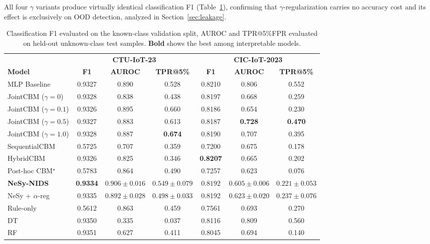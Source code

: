 \documentclass[journal]{IEEEtran}
\begin{document}
All four $\gamma$ variants produce virtually identical classification F1 (Table~\ref{tab:main}), confirming that $\gamma$-regularization carries no accuracy cost and its effect is exclusively on OOD detection, analyzed in Section~\ref{sec:leakage}.


\begin{table}[!t]
\renewcommand{\arraystretch}{1.15}
\caption{Classification F1 evaluated on the known-class validation split, AUROC and TPR@5\%FPR evaluated on
  held-out unknown-class test samples.
  \textbf{Bold} shows the best among interpretable models.}
\label{tab:main}
\centering
\small
\begin{tabular}{lcccccc}
\toprule
& \multicolumn{3}{c}{\textbf{CTU-IoT-23}} &
  \multicolumn{3}{c}{\textbf{CIC-IoT-2023}} \\
\cmidrule(lr){2-4}\cmidrule(lr){5-7}
\textbf{Model} & \textbf{F1} & \textbf{AUROC} & \textbf{TPR@5\%} &
                 \textbf{F1} & \textbf{AUROC} & \textbf{TPR@5\%} \\
\midrule
MLP Baseline
  & 0.9327 & 0.890 & 0.528
  & 0.8210 & 0.806 & 0.552 \\
\midrule
JointCBM ($\gamma{=}0$)
  & 0.9328 & 0.838 & 0.438
  & 0.8197 & 0.668 & 0.259 \\
JointCBM ($\gamma{=}0.1$)
  & 0.9326 & 0.895 & 0.660
  & 0.8186 & 0.654 & 0.230 \\
JointCBM ($\gamma{=}0.5$)
  & 0.9327 & 0.883 & 0.613
  & 0.8187 & \textbf{0.728} & \textbf{0.470} \\
JointCBM ($\gamma{=}1.0$)
  & 0.9328 & 0.887 & \textbf{0.674}
  & 0.8190 & 0.707 & 0.395 \\
SequentialCBM
  & 0.5725 & 0.707 & 0.359
  & 0.7200 & 0.675 & 0.178 \\
HybridCBM
  & 0.9326 & 0.825 & 0.346
  & \textbf{0.8207} & 0.665 & 0.202 \\
Post-hoc CBM$^\star$
  & 0.5783 & 0.864 & 0.490
  & 0.7257 & 0.623 & 0.076 \\
\midrule
\textbf{NeSy-NIDS}
  & \textbf{0.9334} & $\mathbf{0.906\pm0.016}$ & $0.549\pm0.079$
  & $0.8192$ & $0.605\pm0.006$ & $0.221\pm0.053$ \\
NeSy + $\alpha$-reg
  & 0.9335 & $0.892\pm0.028$ & $0.498\pm0.033$
  & 0.8192 & $0.623\pm0.020$ & $0.237\pm0.076$ \\
Rule-only
  & 0.5612 & 0.863 & 0.459
  & 0.7561 & 0.693 & 0.270 \\
\midrule
DT
  & 0.9350 & 0.335 & 0.037
  & 0.8116 & 0.809 & 0.560 \\
RF
  & 0.9351 & 0.627 & 0.411
  & 0.8045 & 0.694 & 0.140 \\
\bottomrule
\end{tabular}
\end{table}
\end{document}
